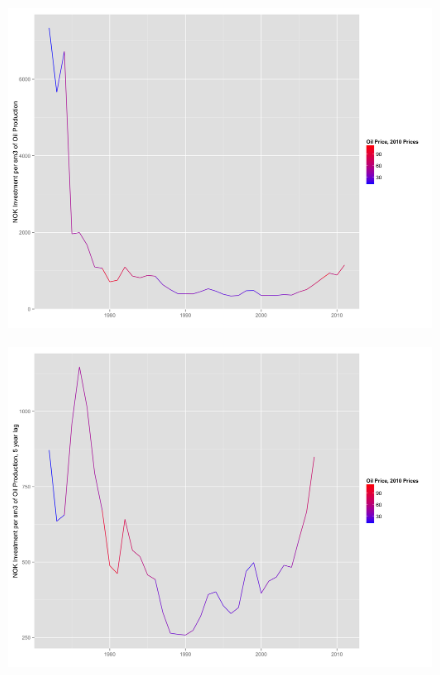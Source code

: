 \documentclass{beamer}
\begin{document}

\begin{frame}[plain]
	\begin{figure}
	\includegraphics[width=1\textwidth]{invest_per_prod.png}
	\end{figure}
\end{frame}


\begin{frame}[plain]
	\begin{figure}
	\includegraphics[width=1\textwidth]{invest_per_prod_l5.png}
	\end{figure}
\end{frame}
\end{document}
